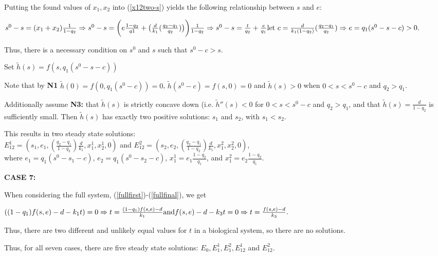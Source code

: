 \documentclass[12pt]{article}
\begin{document}
\noindent Putting the found values of $x_1, x_2$ into (\ref{x12two-s}) yields the following relationship between $s$ and $e$:

\noindent $s^0-s=(x_1+x_2)\frac{1}{1-q_2} \\ 
\Rightarrow s^0-s=\bigg( e\frac{1-q_2}{q1}+ \big( \frac{d}{k_1}(\frac{q_2-q_1}{q_2})\big)\bigg)\frac{1}{1-q_2}\\ 
\Rightarrow s^0-s=\frac{t}{q_2}+\frac{e}{q_1} \\
\text{let } c= \frac{d}{k_1 (1-q_2)}(\frac{q_2-q_1}{q_2}) 
\Rightarrow e = q_1(s^0-s-c) >0. $

\noindent Thus, there is a necessary condition on $s^0$ and $s$ such that $s^0- c>s.$

\noindent Set $\tilde{h}(s)=f(s,q_1(s^0-s-c))$

\noindent Note that by \textbf{N1} $\tilde{h}(0)=f(0,q_1(s^0 - c))=0$, $\tilde{h}(s^0-c)=f(s,0)=0$ and $\tilde{h}(s)>0$ when $0<s<s^0 - c$ and $q_2>q_1$. 

\noindent Additionally assume \textbf{N3:} that $\tilde{h}(s)$ is strictly concave down (i.e. $\tilde{h}''(s)<0$ for $0<s<s^0 - c$ and $q_2>q_1$, and that $\tilde{h}(s)=\frac{d}{1-q_2}$ is sufficiently small. Then $\tilde{h}(s)$ has exactly two positive solutions: $s_{1}$ and $s_2$, with $s_1< s_2$.

\noindent This results in two steady state solutions:\\ $E_{12}^1=(s_1, e_1, (\frac{q_2 - q_1}{1-q_2})\frac{d}{k_1}, x_1^1, x_2^1,0)$ and $E_{12}^2=(s_2, e_2, (\frac{q_2 - q_1}{1-q_2})\frac{d}{k_1} , x_1^2, x_2^2,0)$,\\ where $e_1 = q_1(s^0-s_1-c)$, $e_2 = q_1(s^0-s_2-c)$, $x_1^1=e_1 \frac{1-q_2}{q_1}$, and $x_1^2=e_2 \frac{1-q_2}{q_1}$. 

\noindent \textbf{CASE 7: }

\noindent When considering the full system, (\ref{fullfirst})-(\ref{fullfinal}), we get 

\noindent $((1-q_1)f(s,e)-d-k_1 t)=0\\
\Rightarrow t = \frac{(1-q_1) f(s,e)-d}{k_1}\\
\text{and}
f(s,e)-d-k_3 t=0\\
\Rightarrow t= \frac{f(s,e)-d}{k_3}.$

\noindent Thus, there are two different and unlikely equal values for $t$ in a biological system, so there are no solutions. 

\noindent Thus, for all seven cases, there are five steady state solutions: $E_0, E_1^1, E_1^2, E_{12}^1$ and $E_{12}^2$. 
\end{document}
